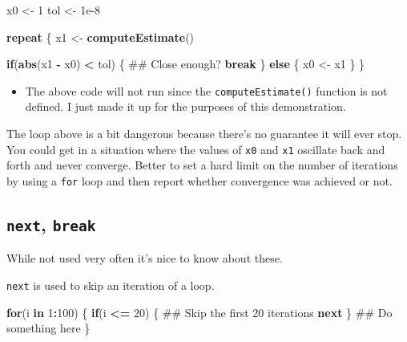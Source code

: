 \documentclass[]{book}
\newenvironment{Shaded}{\begin{snugshade}}{\end{snugshade}}
\newcommand{\KeywordTok}[1]{\textcolor[rgb]{0.13,0.29,0.53}{\textbf{#1}}}
\newcommand{\DecValTok}[1]{\textcolor[rgb]{0.00,0.00,0.81}{#1}}
\newcommand{\FloatTok}[1]{\textcolor[rgb]{0.00,0.00,0.81}{#1}}
\newcommand{\StringTok}[1]{\textcolor[rgb]{0.31,0.60,0.02}{#1}}
\newcommand{\ControlFlowTok}[1]{\textcolor[rgb]{0.13,0.29,0.53}{\textbf{#1}}}
\newcommand{\OperatorTok}[1]{\textcolor[rgb]{0.81,0.36,0.00}{\textbf{#1}}}
\newcommand{\NormalTok}[1]{#1}
\newenvironment{rmdblock}[1]
  {\begin{shaded*}
  \begin{itemize}
  \renewcommand{\labelitemi}{
    \raisebox{-.7\height}[0pt][0pt]{
      {\setkeys{Gin}{width=3em,keepaspectratio}\texttt{[image: images/\#1]}}
    }
  }
  \item
  }
  {
  \end{itemize}
  \end{shaded*}
  }
\newenvironment{rmdnote}
  {\begin{rmdblock}{note}}
  {\end{rmdblock}}
\theoremstyle{definition}
\theoremstyle{definition}
\theoremstyle{definition}
\theoremstyle{remark}
\begin{document}
\begin{Shaded}
\begin{Highlighting}[]
\NormalTok{x0 <-}\StringTok{ }\DecValTok{1}
\NormalTok{tol <-}\StringTok{ }\FloatTok{1e-8}

\ControlFlowTok{repeat}\NormalTok{ \{}
\NormalTok{        x1 <-}\StringTok{ }\KeywordTok{computeEstimate}\NormalTok{()}
        
        \ControlFlowTok{if}\NormalTok{(}\KeywordTok{abs}\NormalTok{(x1 }\OperatorTok{-}\StringTok{ }\NormalTok{x0) }\OperatorTok{<}\StringTok{ }\NormalTok{tol) \{  ## Close enough?}
                \ControlFlowTok{break}
\NormalTok{        \} }\ControlFlowTok{else}\NormalTok{ \{}
\NormalTok{                x0 <-}\StringTok{ }\NormalTok{x1}
\NormalTok{        \} }
\NormalTok{\}}
\end{Highlighting}
\end{Shaded}

\begin{rmdnote}
The above code will not run since the \texttt{computeEstimate()}
function is not defined. I just made it up for the purposes of this
demonstration.
\end{rmdnote}

The loop above is a bit dangerous because there's no guarantee it will
ever stop. You could get in a situation where the values of \texttt{x0}
and \texttt{x1} oscillate back and forth and never converge. Better to
set a hard limit on the number of iterations by using a \texttt{for}
loop and then report whether convergence was achieved or not.

\subsection{\texorpdfstring{\texttt{next},
\texttt{break}}{next, break}}\label{next-break}

While not used very often it's nice to know about these.

\texttt{next} is used to skip an iteration of a loop.

\begin{Shaded}
\begin{Highlighting}[]
\ControlFlowTok{for}\NormalTok{(i }\ControlFlowTok{in} \DecValTok{1}\OperatorTok{:}\DecValTok{100}\NormalTok{) \{}
        \ControlFlowTok{if}\NormalTok{(i }\OperatorTok{<=}\StringTok{ }\DecValTok{20}\NormalTok{) \{}
\NormalTok{                ## Skip the first 20 iterations}
                \ControlFlowTok{next}                 
\NormalTok{        \}}
\NormalTok{        ## Do something here}
\NormalTok{\}}
\end{Highlighting}
\end{Shaded}
\end{document}
